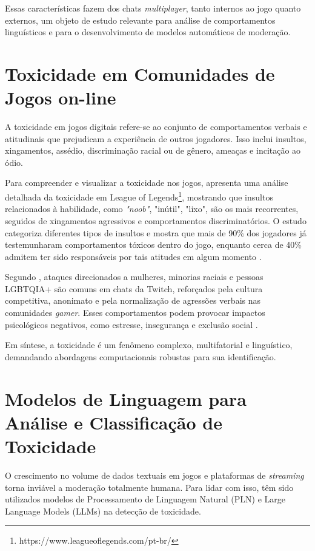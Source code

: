 \documentclass{eic-bcc-tcc}
\begin{document}
Essas características fazem dos chats \textit{multiplayer}, tanto internos ao jogo quanto externos, um objeto de estudo relevante para análise de comportamentos linguísticos e para o desenvolvimento de modelos automáticos de moderação.

\section{Toxicidade em Comunidades de Jogos  on-line }

A toxicidade em jogos digitais refere-se ao conjunto de comportamentos verbais e atitudinais que prejudicam a experiência de outros jogadores. Isso inclui insultos, xingamentos, assédio, discriminação racial ou de gênero, ameaças e incitação ao ódio.

Para compreender e visualizar a toxicidade nos jogos, \cite{assali2024comportamento} apresenta uma análise detalhada da toxicidade em League of Legends\footnote{https://www.leagueoflegends.com/pt-br/}, mostrando que insultos relacionados à habilidade, como \textit{"noob"}, "inútil", "lixo", são os mais recorrentes, seguidos de xingamentos agressivos e comportamentos discriminatórios. O estudo categoriza diferentes tipos de insultos e mostra que mais de 90\% dos jogadores já testemunharam comportamentos tóxicos dentro do jogo, enquanto cerca de 40\% admitem ter sido responsáveis por tais atitudes em algum momento .

Segundo \cite{sbgames}, ataques direcionados a mulheres, minorias raciais e pessoas LGBTQIA+ são comuns em chats da Twitch, reforçados pela cultura competitiva, anonimato e pela normalização de agressões verbais nas comunidades \textit{gamer}. Esses comportamentos podem provocar impactos psicológicos negativos, como estresse, insegurança e exclusão social .

Em síntese, a toxicidade é um fenômeno complexo, multifatorial e linguístico, demandando abordagens computacionais robustas para sua identificação.

\section{Modelos de Linguagem para Análise e Classificação de Toxicidade}

O crescimento no volume de dados textuais em jogos e plataformas de \textit{streaming} torna inviável a moderação totalmente humana. Para lidar com isso, têm sido utilizados modelos de Processamento de Linguagem Natural (PLN) e Large Language Models (LLMs) na detecção de toxicidade.
\end{document}
